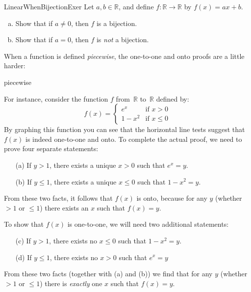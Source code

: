 \begin{exercise}{LinearWhenBijectionExer}
Let $a,b \in \mathbb{R}$, and define $f \colon \mathbb{R} \to \mathbb{R}$ by $f(x) = a x + b$. 
\begin{enumerate}[(a)]
\item \label{LinearWhenBijectionExer-not0}
Show that if $a \neq 0$, then $f$ is a bijection.
\item \label{LinearWhenBijectionExer-0}
Show that if $a = 0$, then $f$ is \emph{not} a bijection.
\end{enumerate}
\end{exercise}


When a function is defined \emph{piecewise}, the one-to-one and  onto proofs are a little harder:

\begin{example}{piecewise}

  For instance, consider the function $f$ from~$\mathbb{R}$ to~$\mathbb{R}$ defined by:
$$ f(x) = 
\begin{cases}
e^x & \mbox{if $x > 0$} \\
1 - x^2 & \mbox{if $x \le 0$}
\end{cases} $$
By graphing this function you can see that the horizontal line tests suggest that  $f(x)$ is indeed one-to-one and onto. To complete the actual proof, we need to prove four separate statements:
\begin{enumerate}[(a)] 
\item[(a)]
If $y > 1$, there exists a unique $x>0$ such that $e^x = y$.
\item[(b)]
If $y \le 1$, there exists a unique $x \le 0$ such that $1-x^2 = y$.
\end{enumerate}
From these two facts, it follows that $f(x)$ is onto, because for any $y$ (whether $>1$ or $\le 1$) there exists an $x$ such that $f(x)=y$. 
\bigskip


To show that $f(x)$ is one-to-one, we will need two additional statements:
\begin{enumerate}[(a)]
\setcounter{enumi}{2} 
\item[(c)]
If $y > 1$, there exists no $x\le0$ such that $1 - x^2 = y$.
\item[(d)]
If $y \le 1$, there exists no $x > 0$ such that $e^x = y$
\end{enumerate}
From these two facts (together with (a) and (b)) we find that for any $y$ (whether $>1$ or $\le 1$) there is \emph{exactly} one $x$ such that $f(x)=y$.
\end{example}
 
